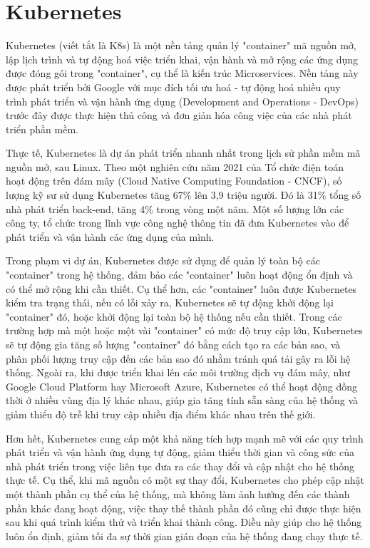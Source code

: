 \documentclass[../DoAn.tex]{subfiles}
\begin{document}
\section{Kubernetes}
\label{section:3.2}
Kubernetes (viết tắt là K8s) là một nền tảng quản lý "container" mã nguồn mở, lập lịch trình và tự động hoá việc triển khai, vận hành và mở rộng các ứng dụng được đóng gói
trong "container", cụ thể là kiến trúc Microservices. Nền tảng này được phát triển bởi Google với mục đích tối ưu hoá - tự động hoá nhiều quy trình phát triển và vận hành ứng dụng
(Development and Operations - DevOps) trước đây được thực hiện thủ công và đơn giản hóa công việc của các nhà phát triển phần mềm.\cite{KubernetesIBM}

Thực tế, Kubernetes là dự án phát triển nhanh nhất trong lịch sử phần mềm mã nguồn mở, sau Linux. Theo một nghiên cứu năm 2021 của Tổ chức điện toán hoạt động trên đám mây
(Cloud Native Computing Foundation - CNCF), số lượng kỹ sư sử dụng Kubernetes tăng 67\% lên 3,9 triệu người. Đó là 31\% tổng số nhà phát triển back-end,
tăng 4\% trong vòng một năm. Một số lượng lớn các công ty, tổ chức trong lĩnh vực công nghệ thông tin đã đưa Kubernetes vào để phát triển và vận hành các ứng dụng của mình.\cite{KubernetesIBM}

Trong phạm vi dự án, Kubernetes được sử dụng để quản lý toàn bộ các "container" trong hệ thống, đảm bảo các "container" luôn hoạt động ổn định và có thể mở rộng khi cần thiết.
Cụ thể hơn, các "container" luôn được Kubernetes kiểm tra trạng thái, nếu có lỗi xảy ra, Kubernetes sẽ tự động khởi động lại "container" đó,
hoặc khởi động lại toàn bộ hệ thống nếu cần thiết. Trong các trường hợp mà một hoặc một vài "container" có mức độ truy cập lớn, Kubernetes sẽ tự động gia tăng số lượng "container" đó
bằng cách tạo ra các bản sao, và phân phối lượng truy cập đến các bản sao đó nhằm tránh quá tải gây ra lỗi hệ thống. Ngoài ra, khi được triển khai lên các môi trường dịch
vụ đám mây, như Google Cloud Platform hay Microsoft Azure, Kubernetes có thể hoạt động đồng thời ở nhiều vùng địa lý khác nhau, giúp gia tăng tính sẵn sàng của hệ thống và giảm thiểu
độ trễ khi truy cập nhiều địa điểm khác nhau trên thế giới.

Hơn hết, Kubernetes cung cấp một khả năng tích hợp mạnh mẽ với các quy trình phát triển và vận hành ứng dụng tự động, giảm thiểu thời gian và công sức của nhà phát triển trong việc
liên tục đưa ra các thay đổi và cập nhật cho hệ thống thực tế. Cụ thể, khi mã nguồn có một sự thay đổi, Kubernetes cho phép cập nhật một thành phần cụ thể của hệ thống, mà không làm ảnh hưởng
đến các thành phần khác đang hoạt động, việc thay thế thành phần đó cũng chỉ được thực hiện sau khi quá trình kiểm thử và triển khai thành công. Điều này giúp cho hệ thống luôn ổn định,
giảm tối đa sự thời gian gián đoạn của hệ thống đang chạy thực tế.
\end{document}
